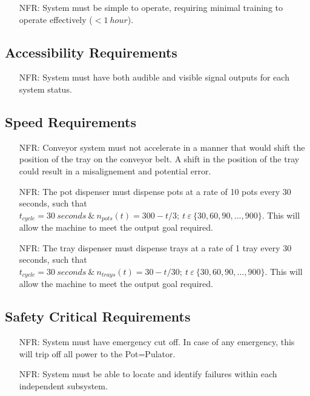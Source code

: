 \documentclass[12pt]{article}
\newcounter{nfrnum} %
\begin{document}
  \noindent \begin{itemize}
  \item[NFR\refstepcounter{nfrnum}\thenfrnum \label{NFR_Learning}:]
  System must be simple to operate, requiring minimal training to operate effectively ($<1\ hour$).

  \end{itemize}


  \subsection{Accessibility Requirements}
 \noindent \begin{itemize}
  \item[NFR\refstepcounter{nfrnum}\thenfrnum \label{NFR_Accessibility1}:]
  System must have both audible and visible signal outputs for each system status.
 \end{itemize}

  \subsection{Speed Requirements}
  \noindent \begin{itemize}
  \item[NFR\refstepcounter{nfrnum}\thenfrnum \label{NFR_Speed1}:]
  Conveyor system must not accelerate in a manner that would shift the position of the tray on the conveyor belt. 
  A shift in the position of the tray could result in a misalignement and potential error.
  
  \item[NFR\refstepcounter{nfrnum}\thenfrnum \label{NFR_Speed2}:] 
  {The pot dispenser must dispense pots at a rate of 10 pots every 30 seconds, such that $t_{cycle}=30\ seconds
      \ \&\ n_{pots}\left(t\right)=300-t/3;\ t\ \varepsilon\ \{30, 60, 90, ..., 900\}$}.
  This will allow the machine to meet the output goal required.

  \item[NFR\refstepcounter{nfrnum}\thenfrnum \label{NFR_Speed3}:] 
  {The tray dispenser must dispense trays at a rate of 1 tray every 30 seconds, such that $t_{cycle}=30\ seconds
      \ \&\ n_{trays}\left(t\right)=30-t/30;\ t\ \varepsilon\ \{30, 60, 90, ..., 900\}$}.
  This will allow the machine to meet the output goal required.
  \end{itemize}  


  \subsection{Safety Critical Requirements}
  \noindent \begin{itemize}
  \item[NFR\refstepcounter{nfrnum}\thenfrnum \label{NFR_Safety1}:]
  System must have emergency cut off. In case of any emergency, this will trip off all power to the Pot=Pulator.
  
  \item[NFR\refstepcounter{nfrnum}\thenfrnum \label{NFR_Safety2}:]
  System must be able to locate and identify failures within each independent subsystem.
  
  \end{itemize}
\end{document}
